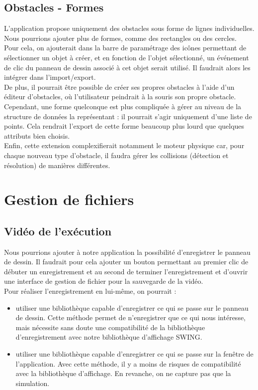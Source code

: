 \documentclass{report}
\begin{document}
\subsection{Obstacles - Formes}

L’application propose uniquement des obstacles sous forme de lignes individuelles. Nous pourrions ajouter plus de formes, comme des rectangles ou des cercles. \\

Pour cela, on ajouterait dans la barre de paramétrage des icônes permettant de sélectionner un objet à créer, et en fonction de l’objet sélectionné, un événement de clic du panneau de dessin associé à cet objet serait utilisé. Il faudrait alors les intégrer dans l’import/export. \\

De plus, il pourrait être possible de créer ses propres obstacles à l’aide d’un éditeur d’obstacles, où l’utilisateur peindrait à la souris son propre obstacle. Cependant, une forme quelconque est plus compliquée à gérer au niveau de la structure de données la représentant : il pourrait s’agir uniquement d’une liste de points. Cela rendrait l’export de cette forme beaucoup plus lourd que quelques attributs bien choisis. \\

Enfin, cette extension complexifierait notamment le moteur physique car, pour chaque nouveau type d'obstacle, il faudra gérer les collisions (détection et résolution) de manières différentes.


\section{Gestion de fichiers}

\subsection{Vidéo de l'exécution}

Nous pourrions ajouter à notre application la possibilité d’enregistrer le panneau de dessin. Il faudrait pour cela ajouter un bouton permettant au premier clic de débuter un enregistrement et au second de terminer l’enregistrement et d’ouvrir une interface de gestion de fichier pour la sauvegarde de la vidéo. \\

Pour réaliser l’enregistrement en lui-même, on pourrait :
\begin{itemize}
\item utiliser une bibliothèque capable d’enregistrer ce qui se passe sur le panneau de dessin. Cette méthode permet de n’enregistrer que ce qui nous intéresse, mais nécessite sans doute une compatibilité de la bibliothèque d’enregistrement avec notre bibliothèque d’affichage SWING.
\item utiliser une bibliothèque capable d’enregistrer ce qui se passe sur la fenêtre de l’application. Avec cette méthode, il y a moins de risques de compatibilité avec la bibliothèque d’affichage. En revanche, on ne capture pas que la simulation.
\end{itemize}
\end{document}
